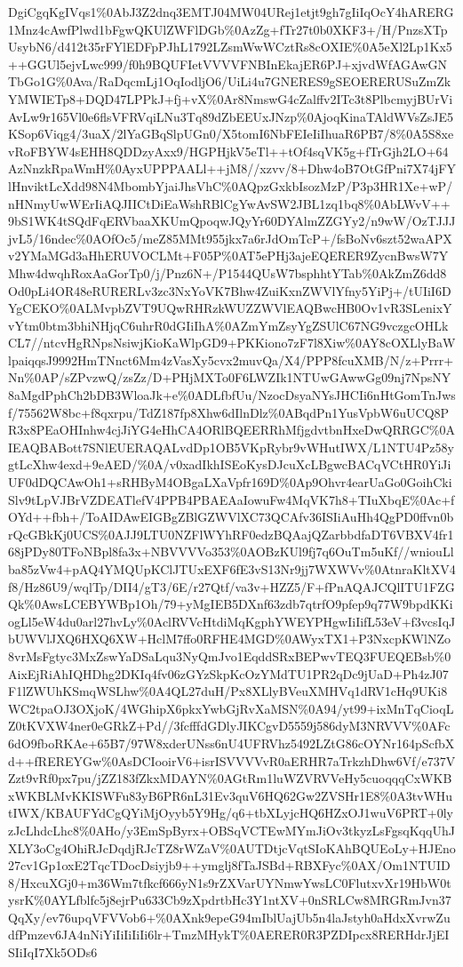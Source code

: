 \documentclass[]{article}
\begin{document}
DgiCgqKgIVqs1\%0AbJ3Z2dnq3EMTJ04MW04URej1etjt9gh7gIiIqOcY4hARERG1Mnz4cAwfPlwd1bFgwQKUlZWFlDGb\%0AzZg+fTr27t0b0XKF3+/H/PnzsXTpUsybN6/d412t35rFYlEDFpPJhL1792LZsmWwWCztRs8cOXIE\%0A5eXl2Lp1Kx5++GGUl5ejvLwc999/f0h9BQUFIetVVVVFNBInEkajER6PJ+xjvdWfAGAwGNTbGo1G\%0Ava/RaDqcmLj1OqIodljO6/UiLi4u7GNERES9gSEOERERUSuZmZkYMWIETp8+DQD47LPPkJ+fj+vX\%0Ar8NmswG4cZalffv2ITc3t8PlbcmyjBUrViAvLw9r165Vl0e6flsVFRVqiLNu3Tq89dZbEEUxJNzp\%0AjoqKinaTAldWVsZsJE5KSop6Viqg4/3uaX/2lYaGBqSlpUGn0/X5tomI6NbFEIeIiIhuaR6PB7/8\%0A5S8xevRoFBYW4sEHH8QDDzyAxx9/HGPHjkV5eTl++tOf4sqVK5g+fTrGjh2LO+64AzNnzkRpaWmH\%0AyxUPPPAALl++jM8//xzvv/8+Dhw4oB7OtGfPni7X74jFYlHnviktLcXdd98N4MbombYjaiJhsVhC\%0AQpzGxkbIsozMzP/P3p3HR1Xe+wP/nHNmyUwWErIiAQJIICtDiEaWshRBlCgYwAvSW2JBL1zq1bq8\%0AbLWvV++9bS1WK4tSQdFqERVbaaXKUmQpoqwJQyYr60DYAlmZZGYy2/n9wW/OzTJJJjvL5/16ndec\%0AOfOc5/meZ85MMt955jkx7a6rJdOmTcP+/fsBoNv6szt52waAPXv2YMaMGd3aHhERUVOCLMt+F05P\%0AT5ePHj3ajeEQERER9ZycnBwsW7YMhw4dwqhRoxAaGorTp0/j/Pnz6N+/P1544QUsW7bsphhtYTab\%0AkZmZ6dd8Od0pLi4OR48eRURERLv3zc3NxYoVK7Bhw4ZuiKxnZWVlYfny5YiPj+/tUIiI6DYgCEKO\%0ALMvpbZVT9UQwRHRzkWUZZWVlEAQBwcHB0Ov1vR3SLenixYvYtm0btm3bhiNHjqC6uhrR0dGIiIhA\%0AZmYmZsyYgZSUlC67NG9vczgcOHLkCL7//ntcvHgRNpsNsiwjKioKaWlpGD9+PKKiono7zF7l8Xiw\%0AY8cOXLlyBaWlpaiqqsJ9992HmTNnct6Mm4zVasXy5cvx2muvQa/X4/PPP8fcuXMB/N/z+Prrr+Nn\%0AP/sZPvzwQ/zsZz/D+PHjMXTo0F6LWZIk1NTUwGAwwGg09nj7NpsNY8aMgdPphCh2bDB3WloaJk+e\%0ADLfbfUu/NzocDsyaNYsJHCIi6nHtGomTnJwsf/75562W8bc+f8qxrpu/TdZ187fp8Xhw6dIlnDlz\%0ABqdPn1YusVpbW6uUCQ8PR3x8PEaOHInhw4cjJiYG4eHhCA4ORlBQEERRhMfjgdvtbnHxeDwQRRGC\%0AIEAQBABott7SNlEUERAQALvdDp1OB5VKpRybr9vWHutIWX/L1NTU4Pz58ygtLcXhw4exd+9eAED/\%0A/v0xadIkhISEoKysDJcuXcLBgwcBACqVCtHR0YiJiUF0dDQCAwOh1+sRHByM4OBgaLXaVpfr169D\%0Ap9Ohvr4earUaGo0GoihCkiSlv9tLpVJBrVZDEATlefV4PPB4PBAEAaIowuFw4MqVK7h8+TIuXbqE\%0Ac+fOYd++fbh+/ToAIDAwEIGBgZBlGZWVlXC73QCAfv36ISIiAuHh4QgPD0ffvn0brQcGBkKj0UCS\%0AJJ9LTU0NZFlWYhRF0edzBQAajQZarbbdfaDT6VBXV4fr168jPDy80TFoNBpl8fa3x+NBVVVVo353\%0AOBzKUl9fj7q6OuTm5uKf//wniouLlba85zVw4+pAQ4YMQUpKClJTUxEXF6fE3vS13Nr9jj7WXWVv\%0AtnraKltXV4f8/Hz86U9/wqlTp/DII4/gT3/6E/r27Qtf/va3v+HZZ5/F+fPnAQAJCQlITU1FZGQk\%0AwsLCEBYWBp1Oh/79+yMgIEB5DXnf63zdb7qtrfO9pfep9q77W9bpdKKiogLl5eW4du0arl27hvLy\%0AclRVVcHtdiMqKgphYWEYPHgwIiIifL53eV+f3vcsIqJbUWVlJXQ6HXQ6XW+HclM7ffo0RFHE4MGD\%0AWyxTX1+P3NxcpKWlNZo8vrMsFgtyc3MxZswYaDSaLqu3NyQmJvo1EqddSRxBEPwvTEQ3FUEQEBsb\%0AixEjRiAhIQHDhg2DKIq4fv06zGYzSkpKcOzYMdTU1PR2qDc9jUaD+Ph4zJ07F1lZWUhKSmqWSLhw\%0A4QL27duH/Px8XLlyBVeuXMHVq1dRV1cHq9UKi8WC2tpaOJ3OXjoK/4WGhipX6pkxYwbGjRvXaMSN\%0A94/yt99+ixMnTqCioqLZ0tKVXW4ner0eGRkZ+Pd//3fcfffdGDlyJIKCgvD5559j586dyM3NRVVV\%0AFc6dO9fboRKAe+65B7/97W8xderUNss6nU4UFRVhz5492LZtG86cOYNr164pScfbXd++fREREYGw\%0AsDCIooirV6+isrISVVVVvR0aERHR7aTrkzhDhw6Vf/e737VZzt9vRf0px7pu/jZZ183fZkxMDAYN\%0AGtRm1luWZVRVVeHy5cuoqqqCxWKBxWKBLMvKKISWFu83yB6PR6nL31Ev3quV6HQ62Gw2ZVSHr1E8\%0A3tvWHutIWX/KBAUFYdCgQYiMjOyyb5Y9Hg/q6+tbXLyjcHQ6HZxOJ1wuV6PRT+0lyzJcLhdcLhc8\%0AHo/y3EmSpByrx+OBSqVCTEwMYmJiOv3tkyzLsFgsqKqqUhJXLY3oCg4OhiRJcDqdjRJcTZ8rWZaV\%0AUTDtjcVqtSIoKAhBQUEoLy+HJEno27cv1Gp1oxE2TqcTDocDsiyjb9++ymglj8fTaJSBd+RBXFyc\%0AX/Om1NTUID8/HxcuXGj0+m36Wm7tfkcf666yN1s9rZXVarUYNmwYwsLC0FlutxvXr19HbW0tysrK\%0AYLfblfc5j8ejrPu633Cb9zXpdrtbHc3Y1ntXV+0nSRLCw8MRGRmJvn37QqXy/ev76upqVFVVob6+\%0AXnk9epeG94mIblUajUb5n4laJstyh0aHdxXvrwZudfPmzev6JA4nNiYiIiIiIiIi6lr+TmzMHykT\%0AERER0R3PZDIpcx8RERHdrJjEISIiIqI7Xk5ODs6
\end{document}
